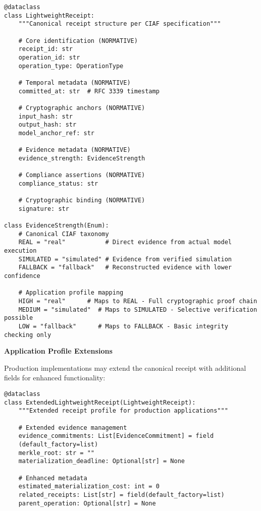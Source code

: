\documentclass[12pt,a4paper]{article}
\begin{document}
\begin{lstlisting}[caption=Canonical Lightweight Receipt Structure (Normative)]
@dataclass
class LightweightReceipt:
    """Canonical receipt structure per CIAF specification"""
    
    # Core identification (NORMATIVE)
    receipt_id: str
    operation_id: str
    operation_type: OperationType
    
    # Temporal metadata (NORMATIVE)
    committed_at: str  # RFC 3339 timestamp
    
    # Cryptographic anchors (NORMATIVE)
    input_hash: str
    output_hash: str
    model_anchor_ref: str
    
    # Evidence metadata (NORMATIVE)
    evidence_strength: EvidenceStrength
    
    # Compliance assertions (NORMATIVE)
    compliance_status: str
    
    # Cryptographic binding (NORMATIVE)
    signature: str
    
class EvidenceStrength(Enum):
    # Canonical CIAF taxonomy
    REAL = "real"           # Direct evidence from actual model execution
    SIMULATED = "simulated" # Evidence from verified simulation
    FALLBACK = "fallback"   # Reconstructed evidence with lower confidence
    
    # Application profile mapping
    HIGH = "real"      # Maps to REAL - Full cryptographic proof chain
    MEDIUM = "simulated"  # Maps to SIMULATED - Selective verification possible  
    LOW = "fallback"      # Maps to FALLBACK - Basic integrity checking only
\end{lstlisting}

\begin{technicalbox}
\textbf{Application Profile Extensions}

Production implementations may extend the canonical receipt with additional fields for enhanced functionality:

\begin{lstlisting}[caption=Extended Receipt Profile (Application Layer)]
@dataclass
class ExtendedLightweightReceipt(LightweightReceipt):
    """Extended receipt profile for production applications"""
    
    # Extended evidence management
    evidence_commitments: List[EvidenceCommitment] = field
    (default_factory=list)
    merkle_root: str = ""
    materialization_deadline: Optional[str] = None
    
    # Enhanced metadata
    estimated_materialization_cost: int = 0
    related_receipts: List[str] = field(default_factory=list)
    parent_operation: Optional[str] = None
\end{lstlisting}
\end{technicalbox}
\end{document}
